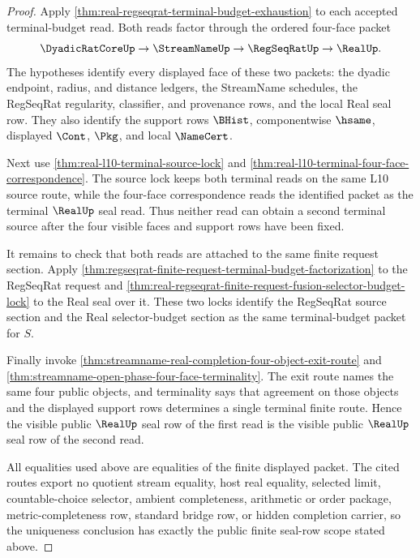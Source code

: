 \begin{proof}
Apply \autoref{thm:real-regseqrat-terminal-budget-exhaustion} to each accepted terminal-budget read. Both reads factor through the ordered four-face packet
$$
\DyadicRatCoreUp \to \StreamNameUp \to \RegSeqRatUp \to \RealUp .
$$
The hypotheses identify every displayed face of these two packets: the dyadic endpoint, radius, and distance ledgers, the StreamName schedules, the RegSeqRat regularity, classifier, and provenance rows, and the local Real seal row. They also identify the support rows $\BHist$, componentwise $\hsame$, displayed $\Cont$, $\Pkg$, and local $\NameCert$.

Next use \autoref{thm:real-l10-terminal-source-lock} and \autoref{thm:real-l10-terminal-four-face-correspondence}. The source lock keeps both terminal reads on the same L10 source route, while the four-face correspondence reads the identified packet as the terminal $\RealUp$ seal read. Thus neither read can obtain a second terminal source after the four visible faces and support rows have been fixed.

It remains to check that both reads are attached to the same finite request section. Apply \autoref{thm:regseqrat-finite-request-terminal-budget-factorization} to the RegSeqRat request and \autoref{thm:real-regseqrat-finite-request-fusion-selector-budget-lock} to the Real seal over it. These two locks identify the RegSeqRat source section and the Real selector-budget section as the same terminal-budget packet for $S$.

Finally invoke \autoref{thm:streamname-real-completion-four-object-exit-route} and \autoref{thm:streamname-open-phase-four-face-terminality}. The exit route names the same four public objects, and terminality says that agreement on those objects and the displayed support rows determines a single terminal finite route. Hence the visible public $\RealUp$ seal row of the first read is the visible public $\RealUp$ seal row of the second read.

All equalities used above are equalities of the finite displayed packet. The cited routes export no quotient stream equality, host real equality, selected limit, countable-choice selector, ambient completeness, arithmetic or order package, metric-completeness row, standard bridge row, or hidden completion carrier, so the uniqueness conclusion has exactly the public finite seal-row scope stated above.
\end{proof}

